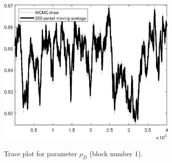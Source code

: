 \begin{figure}[H]
\centering
  \includegraphics[width=0.8\textwidth]{BRS_growth/graphs/TracePlot_rho_D_blck_1}\\
    \caption{Trace plot for parameter ${\rho_D}$ (block number 1).}
\end{figure}
